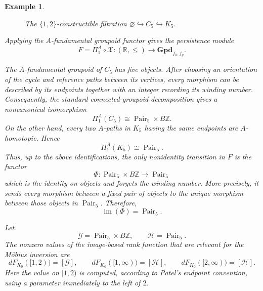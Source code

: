 \documentclass{amsart}
\newcommand{\R}{\mathbb{R}}
\newcommand{\Z}{\mathbb{Z}}
\newtheorem{example}[theorem]{Example}
\begin{document}
\begin{example}
\begin{figure}[ht]
\caption{The $\{1,2\}$-constructible filtration
\(\varnothing\hookrightarrow C_5\hookrightarrow K_5\).}
\label{fig:C5-K5-filtration}
\end{figure}
Applying the \(A\)-fundamental groupoid functor gives the persistence
module
\[
F=\Pi_1^A\circ\mathcal{X}\colon
(\R,\leq)\longrightarrow\mathbf{Gpd}_{f_0,f_g}.
\]

The \(A\)-fundamental groupoid of \(C_5\) has five objects. After choosing
an orientation of the cycle and reference paths between its vertices,
every morphism can be described by its endpoints together with an
integer recording its winding number. Consequently, the standard connected-groupoid decomposition \cite[Section~1.7, equation~(1.7.1)]{ronbrown2} gives a noncanonical isomorphism
\[
\Pi_1^A(C_5)
\cong
\operatorname{Pair}_5\times B\Z.
\]
On the other hand, every two \(A\)-paths in \(K_5\) having the same
endpoints are \(A\)-homotopic. Hence
\[
\Pi_1^A(K_5)
\cong
\operatorname{Pair}_5.
\]
Thus, up to the above identifications, the only nonidentity transition
in \(F\) is the functor
\[
\Phi\colon
\operatorname{Pair}_5\times B\Z
\longrightarrow
\operatorname{Pair}_5
\]
which is the identity on objects and forgets the winding number. More
precisely, it sends every morphism between a fixed pair of objects to
the unique morphism between those objects in
\(\operatorname{Pair}_5\). Therefore,
\[
\operatorname{im}(\Phi)=\operatorname{Pair}_5.
\]

Let
\[
\mathcal{G}
=
\operatorname{Pair}_5\times B\Z,
\qquad
\mathcal{H}
=
\operatorname{Pair}_5.
\]
The nonzero values of the image-based rank function that are relevant
for the Möbius inversion are
\[
dF_{K_0}([1,2))=[\mathcal{G}],
\qquad
dF_{K_0}([1,\infty))=[\mathcal{H}],
\qquad
dF_{K_0}([2,\infty))=[\mathcal{H}].
\]
Here the value on \([1,2)\) is computed, according to Patel's endpoint
convention, using a parameter immediately to the left of \(2\).


\end{example}
\end{document}
